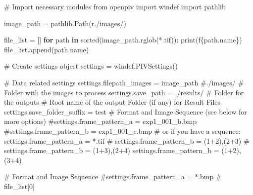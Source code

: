 \documentclass[
  english,
  letterpaper,
  numbers=noendperiod,
  DIV=13]{scrreprt}
\newenvironment{Shaded}{\begin{snugshade}}{\end{snugshade}}
\newcommand{\BuiltInTok}[1]{\textcolor[rgb]{0.00,0.23,0.31}{#1}}
\newcommand{\CommentTok}[1]{\textcolor[rgb]{0.37,0.37,0.37}{#1}}
\newcommand{\ControlFlowTok}[1]{\textcolor[rgb]{0.00,0.23,0.31}{\textbf{#1}}}
\newcommand{\DecValTok}[1]{\textcolor[rgb]{0.68,0.00,0.00}{#1}}
\newcommand{\ImportTok}[1]{\textcolor[rgb]{0.00,0.46,0.62}{#1}}
\newcommand{\KeywordTok}[1]{\textcolor[rgb]{0.00,0.23,0.31}{\textbf{#1}}}
\newcommand{\NormalTok}[1]{\textcolor[rgb]{0.00,0.23,0.31}{#1}}
\newcommand{\OperatorTok}[1]{\textcolor[rgb]{0.37,0.37,0.37}{#1}}
\newcommand{\SpecialCharTok}[1]{\textcolor[rgb]{0.37,0.37,0.37}{#1}}
\newcommand{\SpecialStringTok}[1]{\textcolor[rgb]{0.13,0.47,0.30}{#1}}
\newcommand{\StringTok}[1]{\textcolor[rgb]{0.13,0.47,0.30}{#1}}
\newcommand{\VerbatimStringTok}[1]{\textcolor[rgb]{0.13,0.47,0.30}{#1}}
\begin{document}
\begin{Shaded}
\begin{Highlighting}[]
\CommentTok{\# Import necessary modules}
\ImportTok{from}\NormalTok{ openpiv }\ImportTok{import}\NormalTok{ windef}
\ImportTok{import}\NormalTok{ pathlib}

\NormalTok{image\_path }\OperatorTok{=}\NormalTok{ pathlib.Path(}\VerbatimStringTok{r\textquotesingle{}}\DecValTok{.}\VerbatimStringTok{/images/\textquotesingle{}}\NormalTok{)}

\NormalTok{file\_list }\OperatorTok{=}\NormalTok{ []}
\ControlFlowTok{for}\NormalTok{ path }\KeywordTok{in} \BuiltInTok{sorted}\NormalTok{(image\_path.rglob(}\StringTok{\textquotesingle{}*.tif\textquotesingle{}}\NormalTok{)):}
    \BuiltInTok{print}\NormalTok{(}\SpecialStringTok{f\textquotesingle{}}\SpecialCharTok{\{}\NormalTok{path}\SpecialCharTok{.}\NormalTok{name}\SpecialCharTok{\}}\SpecialStringTok{\textquotesingle{}}\NormalTok{)}
\NormalTok{    file\_list.append(path.name)}

\CommentTok{\# Create settings object}
\NormalTok{settings }\OperatorTok{=}\NormalTok{ windef.PIVSettings()}

\CommentTok{\# Data related settings}
\NormalTok{settings.filepath\_images }\OperatorTok{=}\NormalTok{ image\_path }\CommentTok{\#\textquotesingle{}./images/\textquotesingle{} \# Folder with the images to process}
\NormalTok{settings.save\_path }\OperatorTok{=} \StringTok{\textquotesingle{}./results/\textquotesingle{}} \CommentTok{\# Folder for the outputs}
\CommentTok{\# Root name of the output Folder (if any) for Result Files}
\NormalTok{settings.save\_folder\_suffix }\OperatorTok{=} \StringTok{\textquotesingle{}test\textquotesingle{}}
\CommentTok{\# Format and Image Sequence (see below for more options)}
\CommentTok{\#settings.frame\_pattern\_a = \textquotesingle{}exp1\_001\_b.bmp\textquotesingle{}}
\CommentTok{\#settings.frame\_pattern\_b = \textquotesingle{}exp1\_001\_c.bmp\textquotesingle{}}
\CommentTok{\# or if you have a sequence:}
\NormalTok{settings.frame\_pattern\_a }\OperatorTok{=} \StringTok{\textquotesingle{}*.tif\textquotesingle{}}
\CommentTok{\# settings.frame\_pattern\_b = \textquotesingle{}(1+2),(2+3)\textquotesingle{}}
\CommentTok{\# settings.frame\_pattern\_b = \textquotesingle{}(1+3),(2+4)\textquotesingle{}}
\NormalTok{settings.frame\_pattern\_b }\OperatorTok{=} \StringTok{\textquotesingle{}(1+2),(3+4)\textquotesingle{}}

\CommentTok{\# Format and Image Sequence}
\CommentTok{\#settings.frame\_pattern\_a = \textquotesingle{}*.bmp\textquotesingle{} \# file\_list[0]}


\end{Highlighting}
\end{Shaded}
\end{document}
